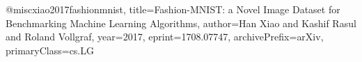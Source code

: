 @misc{xiao2017fashionmnist,
    title={Fashion-MNIST: a Novel Image Dataset for Benchmarking Machine Learning Algorithms},
    author={Han Xiao and Kashif Rasul and Roland Vollgraf},
    year={2017},
    eprint={1708.07747},
    archivePrefix={arXiv},
    primaryClass={cs.LG}
}